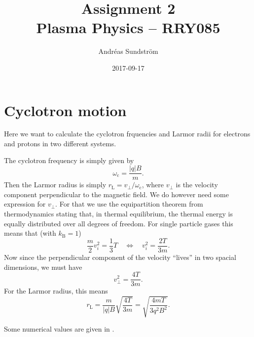 \documentclass[11pt,a4paper, 
swedish, english %
]{article}
\newcommand{\wc}{\ensuremath{\omega_{\text{c}}}}
\newcommand{\rL}{\ensuremath{r_{\text{L}}}}
\begin{document}


\title{Assignment 2 \\
{\Large Plasma Physics -- RRY085}}
\author{Andréas Sundström}
\date{2017-09-17}

\maketitle




\section{Cyclotron motion}
Here we want to calculate the cyclotron frquencies and Larmor radii
for electrons and protons in two different systems. 

The cyclotron frequency is simply given by
\begin{equation} \label{eq1:wc}
\wc = \frac{|q|B}{m}.
\end{equation}
Then the Larmor radius is simply $\rL=v_\perp/\wc$, where $v_\perp$ is
the velocity component perpendicular to the magnetic field. We do
however need some expression for $v_\perp$. For that we use the
equipartition theorem from thermodynamics stating that, in thermal
equilibrium, the thermal energy is equally distributed over all
degrees of freedom. For single particle gases this means that 
(with $k_\text{B}=1$)
\begin{equation}
\frac{m}{2} v_i^2 = \frac{1}{3} T
\quad\Longleftrightarrow\quad
v_i^2 = \frac{2 T}{3m}.
\end{equation}
Now since the perpendicular component of the velocity ``lives'' in two
spacial dimensions, we must have
\begin{equation}
v_\perp^2 = \frac{4 T}{3m}.
\end{equation}
For the Larmor radius, this means
\begin{equation}
\rL = \frac{m}{|q|B}\sqrt{\frac{4 T}{3m}}
=\sqrt{\frac{4m T}{3q^2B^2}}.
\end{equation}

Some numerical values are given in .
\end{document}
